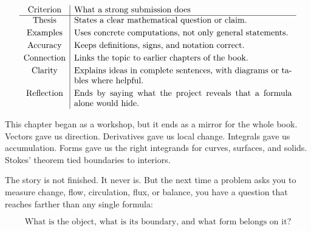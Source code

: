\[
\begin{array}{c|p{9cm}}
\text{Criterion} & \text{What a strong submission does} \\ \hline
\text{Thesis} & States a clear mathematical question or claim.\\[1mm]
\text{Examples} & Uses concrete computations, not only general statements.\\[1mm]
\text{Accuracy} & Keeps definitions, signs, and notation correct.\\[1mm]
\text{Connection} & Links the topic to earlier chapters of the book.\\[1mm]
\text{Clarity} & Explains ideas in complete sentences, with diagrams or tables where helpful.\\[1mm]
\text{Reflection} & Ends by saying what the project reveals that a formula alone would hide.
\end{array}
\]

This chapter began as a workshop, but it ends as a mirror for the whole book.  Vectors
gave us direction.  Derivatives gave us local change.  Integrals gave us accumulation.
Forms gave us the right integrands for curves, surfaces, and solids.  Stokes' theorem
tied boundaries to interiors.

The story is not finished.  It never is.  But the next time a problem asks you to measure
change, flow, circulation, flux, or balance, you have a question that reaches farther than
any single formula:

\[
\boxed{
    \text{What is the object, what is its boundary, and what form belongs on it?}
}
\]
